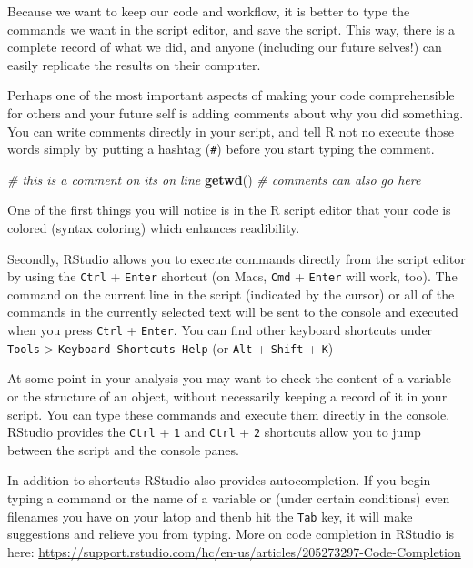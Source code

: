 \documentclass[
]{book}
\newenvironment{Shaded}{\begin{snugshade}}{\end{snugshade}}
\newcommand{\CommentTok}[1]{\textcolor[rgb]{0.56,0.35,0.01}{\textit{#1}}}
\newcommand{\KeywordTok}[1]{\textcolor[rgb]{0.13,0.29,0.53}{\textbf{#1}}}
\newcommand{\NormalTok}[1]{#1}
\begin{document}
Because we want to keep our code and workflow, it is better to type
the commands we want in the script editor, and save the script. This way, there
is a complete record of what we did, and anyone (including our future selves!)
can easily replicate the results on their computer.

Perhaps one of the most important aspects of making your code comprehensible for others and your future self is adding comments about why you did something. You can write comments directly in your script, and tell R not no execute those words simply by putting a hashtag (\texttt{\#}) before you start typing the comment.

\begin{Shaded}
\begin{Highlighting}[]
\CommentTok{# this is a comment on its on line}
\KeywordTok{getwd}\NormalTok{() }\CommentTok{# comments can also go here}
\end{Highlighting}
\end{Shaded}

One of the first things you will notice is in the R script editor that your code is colored (syntax coloring) which enhances readibility.

Secondly, RStudio allows you to execute commands directly from the script editor by using
the \texttt{Ctrl} + \texttt{Enter} shortcut (on Macs, \texttt{Cmd} +
\texttt{Enter} will work, too). The command on the current line in the
script (indicated by the cursor) or all of the commands in the currently
selected text will be sent to the console and executed when you press
\texttt{Ctrl} + \texttt{Enter}. You can find other keyboard shortcuts under \texttt{Tools} \textgreater{} \texttt{Keyboard\ Shortcuts\ Help} (or \texttt{Alt} + \texttt{Shift} + \texttt{K})

At some point in your analysis you may want to check the content of a variable
or the structure of an object, without necessarily keeping a record of it in
your script. You can type these commands and execute them directly in the
console. RStudio provides the \texttt{Ctrl} + \texttt{1} and
\texttt{Ctrl} + \texttt{2} shortcuts allow you to jump between the
script and the console panes.

In addition to shortcuts RStudio also provides autocompletion. If you begin typing a command or the name of a variable or (under certain conditions) even filenames you have on your latop and thenb hit the \texttt{Tab} key, it will make suggestions and relieve you from typing. More on code completion in RStudio is here: \url{https://support.rstudio.com/hc/en-us/articles/205273297-Code-Completion}
\end{document}
